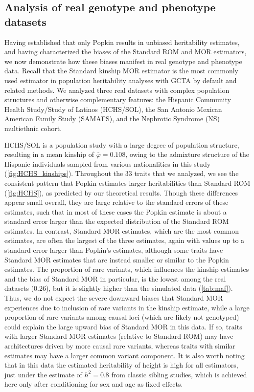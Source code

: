 \documentclass[11pt]{article}
\begin{document}
\subsection{Analysis of real genotype and phenotype datasets}

Having established that only Popkin results in unbiased heritability estimates, and having characterized the biases of the Standard ROM and MOR estimators, we now demonstrate how these biases manifest in real genotype and phenotype data.  Recall that the Standard kinship MOR estimator is the most commonly used estimator in population heritability analyses with GCTA by default and related methods. We analyzed three real datasets with complex population structures and otherwise complementary features: the Hispanic Community Health Study/Study of Latinos (HCHS/SOL), the San Antonio Mexican American Family Study (SAMAFS), and the Nephrotic Syndrome (NS) multiethnic cohort.


HCHS/SOL is a population study with a large degree of population structure, resulting in a mean kinship of $\bar{\varphi} = 0.108$, owing to the admixture structure of the Hispanic individuals sampled from various nationalities in this study (\cref{fig:HCHS_kinships}).
Throughout the 33 traits that we analyzed, we see the consistent pattern that Popkin estimates larger heritabilities than Standard ROM (\cref{fig:HCHS}), as predicted by our theoretical results.
Though these differences appear small overall, they are large relative to the standard errors of these estimates, such that in most of these cases the Popkin estimate is about a standard error larger than the expected distribution of the Standard ROM estimates.
In contrast, Standard MOR estimates, which are the most common estimates, are often the largest of the three estimates, again with values up to a standard error larger than Popkin's estimates, although some traits have Standard MOR estimates that are instead smaller or similar to the Popkin estimates.
The proportion of rare variants, which influences the kinship estimates and the bias of Standard MOR in particular, is the lowest among the real datasets (0.26), but it is slightly higher than the simulated data (\cref{tab:maf}).
Thus, we do not expect the severe downward biases that Standard MOR experiences due to inclusion of rare variants in the kinship estimate, while a large proportion of rare variants among causal loci (which are likely not genotyped) could explain the large upward bias of Standard MOR in this data.
If so, traits with larger Standard MOR estimates (relative to Standard ROM) may have architectures driven by more causal rare variants, whereas traits with similar estimates may have a larger common variant component.
It is also worth noting that in this data the estimated heritability of height is high for all estimators, just under the estimate of $h^2=0.8$ from classic sibling studies, which is achieved here only after conditioning for sex and age as fixed effects.
\end{document}

